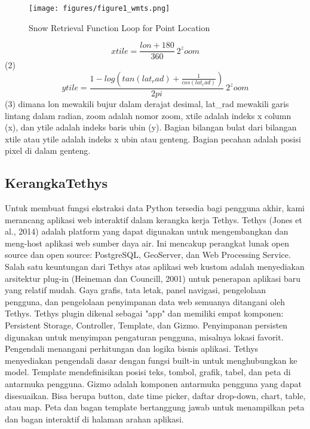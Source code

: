\begin{figure}[ht]

\centerline{\texttt{[image: figures/figure1\_wmts.png]}}

\caption{Snow Retrieval Function Loop for Point Location}

\label{figure1_wmts}

\end{figure}

\begin{equation}
	    xtile = \frac{lon + 180}{360} \ 2^zoom 
\end{equation}
(2)
\begin{equation}
	    ytile =\frac{1-log (tan(lat_rad) + \frac{1}{cos(lat_rad)})}{2pi} \ 2^zoom 
\end{equation}
(3)
dimana lon mewakili bujur dalam derajat desimal, lat_rad mewakili garis lintang dalam radian, zoom adalah nomor zoom, xtile adalah 
indeks x column (x), dan ytile adalah indeks baris ubin (y). Bagian bilangan bulat dari bilangan xtile atau ytile adalah indeks x ubin 
atau genteng. Bagian pecahan adalah posisi pixel di dalam genteng. \cite{Kadlec2016Extracting} 

\subsection{KerangkaTethys}

Untuk membuat fungsi ekstraksi data Python tersedia bagi pengguna akhir, kami merancang aplikasi web interaktif dalam kerangka kerja 
Tethys. Tethys (Jones et al., 2014) adalah platform yang dapat digunakan untuk mengembangkan dan meng-host aplikasi web sumber daya air. 
Ini mencakup perangkat lunak open source dan open source: PostgreSQL, GeoServer, dan Web Processing Service. Salah satu keuntungan dari 
Tethys atas aplikasi web kustom adalah menyediakan arsitektur plug-in (Heineman dan Councill, 2001) untuk penerapan aplikasi baru yang 
relatif mudah. Gaya grafis, tata letak, panel navigasi, pengelolaan pengguna, dan pengelolaan penyimpanan data web semuanya ditangani 
oleh Tethys. Tethys plugin dikenal sebagai "app" dan memiliki empat komponen: Persistent Storage, Controller, Template, dan Gizmo. 
Penyimpanan persisten digunakan untuk menyimpan pengaturan pengguna, misalnya lokasi favorit. Pengendali menangani perhitungan dan 
logika bisnis aplikasi. Tethys menyediakan pengendali dasar dengan fungsi built-in untuk menghubungkan ke model. Template mendefinisikan 
posisi teks, tombol, grafik, tabel, dan peta di antarmuka pengguna. Gizmo adalah komponen antarmuka pengguna yang dapat disesuaikan. 
Bisa berupa button, date time picker, daftar drop-down, chart, table, atau map. Peta dan bagan template bertanggung jawab untuk 
menampilkan peta dan bagan interaktif di halaman arahan aplikasi.

